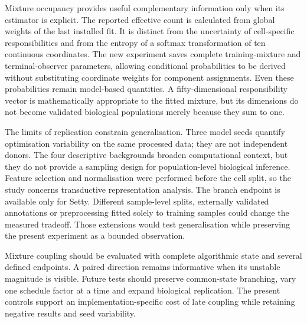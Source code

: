 \documentclass[11pt]{article}
\begin{document}
Mixture occupancy provides useful complementary information only when its estimator is explicit. The reported effective count is calculated from global weights of the last installed fit. It is distinct from the uncertainty of cell-specific responsibilities and from the entropy of a softmax transformation of ten continuous coordinates. The new experiment saves complete training-mixture and terminal-observer parameters, allowing conditional probabilities to be derived without substituting coordinate weights for component assignments. Even these probabilities remain model-based quantities. A fifty-dimensional responsibility vector is mathematically appropriate to the fitted mixture, but its dimensions do not become validated biological populations merely because they sum to one.

The limits of replication constrain generalisation. Three model seeds quantify optimisation variability on the same processed data; they are not independent donors. The four descriptive backgrounds broaden computational context, but they do not provide a sampling design for population-level biological inference. Feature selection and normalisation were performed before the cell split, so the study concerns transductive representation analysis. The branch endpoint is available only for Setty. Different sample-level splits, externally validated annotations or preprocessing fitted solely to training samples could change the measured tradeoff. Those extensions would test generalisation while preserving the present experiment as a bounded observation.

Mixture coupling should be evaluated with complete algorithmic state and several defined endpoints. A paired direction remains informative when its unstable magnitude is visible. Future tests should preserve common-state branching, vary one schedule factor at a time and expand biological replication. The present controls support an implementation-specific cost of late coupling while retaining negative results and seed variability.
\end{document}
